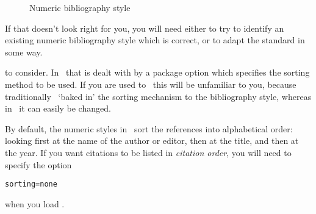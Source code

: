 \begin{figure}
\caption{Numeric bibliography style\label{numeric-examples}}
\end{figure}

If that doesn't look right for you, you will need either to try to
identify an existing numeric bibliography style which is correct, or
to adapt the standard in some way.

 to consider. In \biblatex\ that
is dealt with by a package option which specifies the sorting method
to be used. If you are used to \bibtex\ this will be unfamiliar to
you, because traditionally \bibtex\ `baked in' the sorting mechanism
to the bibliography style, whereas in \biblatex\ it can easily be
changed.

By default, the numeric styles in \biblatex\ sort the references into
alphabetical order: looking first at the name of the author or editor,
then at the title, and then at the year. If you want citations to be
listed in \emph{citation order}, you will need to specify the option
\begin{center}
\verb|sorting=none|
\end{center}
when you load \biblatex.

